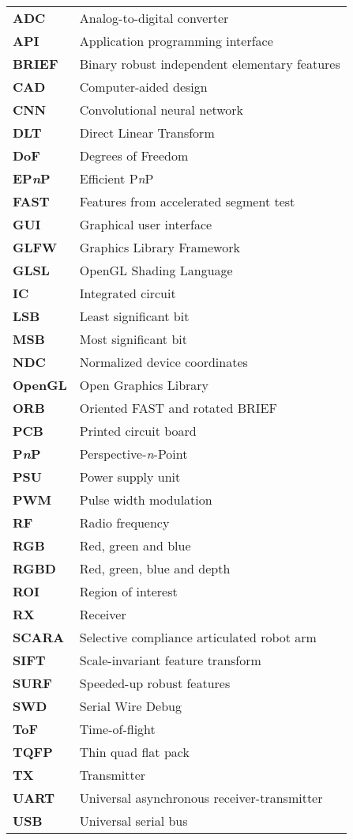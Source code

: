 \begin{tabular}{p{3cm}l}
  	\textbf{ADC}			& Analog-to-digital converter \\
  	\textbf{API}			& Application programming interface \\
  	\textbf{BRIEF}			& Binary robust independent elementary features \\
  	\textbf{CAD}			& Computer-aided design \\
	\textbf{CNN} 			& Convolutional neural network \\
	\textbf{DLT}			& Direct Linear Transform \\
	\textbf{DoF}			& Degrees of Freedom \\
	\textbf{EP\textit{n}P}	& Efficient P\textit{n}P \\
	\textbf{FAST}			& Features from accelerated segment test \\
	\textbf{GUI}			& Graphical user interface \\
	\textbf{GLFW}			& Graphics Library Framework \\
	\textbf{GLSL}			& OpenGL Shading Language \\
	\textbf{IC}				& Integrated circuit \\	
	\textbf{LSB}			& Least significant bit \\
	\textbf{MSB}			& Most significant bit \\
	\textbf{NDC}			& Normalized device coordinates \\
	\textbf{OpenGL}			& Open Graphics Library \\
	\textbf{ORB}			& Oriented FAST and rotated BRIEF \\
	\textbf{PCB}			& Printed circuit board \\
	\textbf{P\textit{n}P}	& Perspective-\textit{n}-Point \\
	\textbf{PSU}			& Power supply unit \\
	\textbf{PWM}			& Pulse width modulation \\
	\textbf{RF}				& Radio frequency \\
	\textbf{RGB}			& Red, green and blue \\
	\textbf{RGBD}			& Red, green, blue and depth \\
	\textbf{ROI}			& Region of interest \\
	\textbf{RX}				& Receiver \\
	\textbf{SCARA}			& Selective compliance articulated robot arm \\
	\textbf{SIFT}			& Scale-invariant feature transform \\
	\textbf{SURF}			& Speeded-up robust features \\
	\textbf{SWD}			& Serial Wire Debug \\
	\textbf{ToF}			& Time-of-flight \\
	\textbf{TQFP}			& Thin quad flat pack \\
	\textbf{TX}				& Transmitter \\
	\textbf{UART} 			& Universal asynchronous receiver-transmitter \\
	\textbf{USB}			& Universal serial bus
	

\end{tabular}


